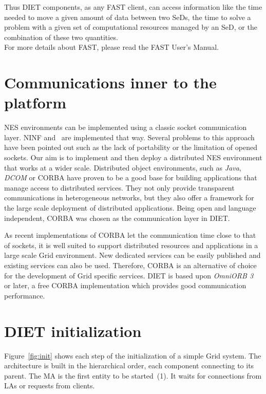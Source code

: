 Thus DIET components, as any FAST client, can access information like the time
needed to move a given amount of data between two SeDs, the time to solve a
problem with a given set of computational resources managed by an SeD, or the
combination of these two quantities.\\

For more details about FAST, please read the FAST User's Manual.


\section{Communications inner to the platform}
\label{sec:CORBA}

NES environments can be implemented using a classic socket communication layer.
NINF and \nsl\ are implemented that way. Several problems to this approach
have been pointed out such as the lack of portability or the limitation of
opened sockets. Our aim is to implement and then deploy a distributed NES
environment that works at a wider scale. Distributed object environments, such
as \emph{Java}, \emph{DCOM} or CORBA have proven to be a good base for
building applications that manage access to distributed services. They not only
provide transparent communications in heterogeneous networks, but they also
offer a framework for the large scale deployment of distributed
applications. Being open and language independent, CORBA was chosen as the
communication layer in DIET.

As recent implementations of CORBA let the communication time close to that of
sockets, it is well suited to support distributed resources and applications in
a large scale Grid environment. New dedicated services can be easily published
and existing services can also be used.  Therefore, CORBA is an alternative of
choice for the development of Grid specific services. DIET is based upon
\emph{OmniORB 3}~\cite{OMNIORB} or later, a free CORBA implementation which
provides good communication performance.


\section{DIET initialization}
\label{init}

Figure~\ref{fig:init} shows each step of the initialization of a simple Grid
system. The architecture is built in the hierarchical order, each component
connecting to its parent. The MA is the first entity to be started~(1). It waits
for connections from LAs or requests from clients.

